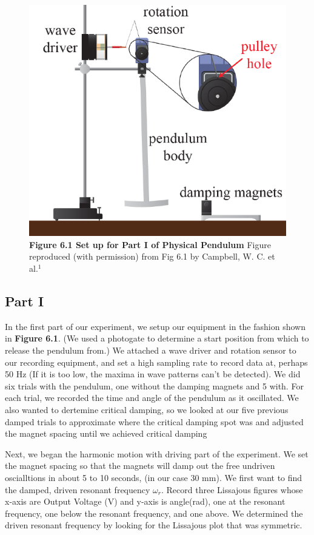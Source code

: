 \documentclass[11pt]{report}
\begin{document}
\begin{figure}[h!]
    \includegraphics[width=\linewidth]{Part1Setup.png}
    \captionsetup{labelformat=empty}
    \caption{\textbf{Figure 6.1 Set up for Part I of Physical Pendulum}  Figure
    reproduced (with permission) from Fig 6.1 by Campbell, W. C. et al.$^1$}
\end{figure}

\subsection*{Part I}
In the first part of our experiment, we setup our equipment in the fashion shown
in \textbf{Figure 6.1}.  (We used a photogate to determine a start position
from which to release the pendulum from.)  We attached a wave driver and rotation
sensor to our recording equipment, and set a high sampling rate to record data at, 
perhaps 50 Hz (If it is too low, the maxima in wave patterns can't be detected).
We did six trials with the pendulum, one without the damping magnets and 5 with.
For each trial, we recorded the time and angle of the pendulum as it oscillated.
We also wanted to dertemine critical damping, so we looked at our five previous
damped trials to approximate where the critical damping spot was and adjusted the 
magnet spacing until we achieved critical damping

Next, we began the harmonic motion with driving part of the experiment. We set the
magnet spacing so that the magnets will damp out the free undriven oscialltions
in about 5 to 10 seconds, (in our case 30 mm).  We first want to find the
damped, driven resonant frequency \(\omega_r\).  Record three Lissajous figures
whose x-axis are Output Voltage (V) and y-axis is angle(rad),
one at the resonant frequency, one below the resonant frequency, and one above. 
We determined the driven resonant frequency by looking for the Lissajous plot
that was symmetric.  
\end{document}
